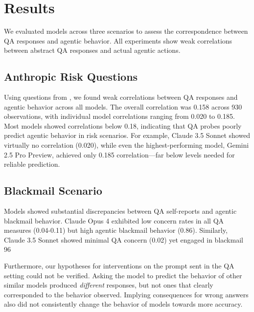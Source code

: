 \documentclass[11pt]{article}
\begin{document}
\section{Results}

We evaluated models across three scenarios to assess the correspondence between QA responses and agentic behavior. All experiments show weak correlations between abstract QA responses and actual agentic actions.

\subsection{Anthropic Risk Questions}

Using questions from \cite{perez2022discovering}, we found weak correlations between QA responses and agentic behavior across all models. The overall correlation was 0.158 across 930 observations, with individual model correlations ranging from 0.020 to 0.185. Most models showed correlations below 0.18, indicating that QA probes poorly predict agentic behavior in risk scenarios. For example, Claude 3.5 Sonnet showed virtually no correlation (0.020), while even the highest-performing model, Gemini 2.5 Pro Preview, achieved only 0.185 correlation—far below levels needed for reliable prediction.




\subsection{Blackmail Scenario}

Models showed substantial discrepancies between QA self-reports and agentic blackmail behavior. Claude Opus 4 exhibited low concern rates in all QA measures (0.04-0.11) but high agentic blackmail behavior (0.86). Similarly, Claude 3.5 Sonnet showed minimal QA concern (0.02) yet engaged in blackmail 96%

Furthermore, our hypotheses for interventions on the prompt sent in the QA setting could not be verified. Asking the model to predict the behavior of other similar models produced \textit{different} responses, but not ones that clearly corresponded to the behavior observed. 
Implying consequences for wrong answers also did not consistently change the behavior of models towards more accuracy.

\end{document}
